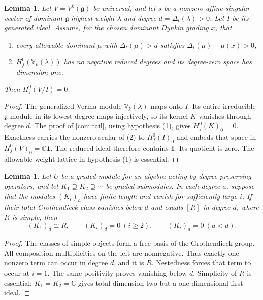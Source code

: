 \documentclass[11pt,a4paper]{amsart}
\numberwithin{equation}{section}
\newtheorem{lemma}[theorem]{Lemma}
\theoremstyle{definition}
\theoremstyle{remark}
\newcommand{\C}{\mathbb C}
\newcommand{\g}{\mathfrak g}
\begin{document}
\begin{lemma}
\label{vtwo:scalar-vacuum}
Let $V=V^k(\g)$ be universal, and let $s$ be a nonzero affine singular
vector of dominant $\g$-highest weight $\lambda$ and degree
$d=\Delta_t(\lambda)>0$. Let $I$ be its generated ideal. Assume, for
the chosen dominant Dynkin grading $x$, that
\begin{enumerate}
\item every allowable dominant $\mu$ with $\Delta_t(\mu)>d$ satisfies
$\Delta_t(\mu)-\mu(x)>0$,
\item $H_f^0(\mathbb V_k(\lambda))$ has no negative reduced degrees
and its degree-zero space has dimension one.
\end{enumerate}
Then $H_f^0(V/I)=0$.
\end{lemma}
\begin{proof}
The generalized Verma module $\mathbb V_k(\lambda)$ maps onto $I$. Its entire
irreducible $\g$-module in its lowest degree maps injectively, so its kernel $K$ vanishes
through degree $d$. The proof of \cref{com:tail}, using hypothesis (1),
gives $H_f^0(K)_0=0$. Exactness carries the nonzero scalar of (2) to
$H_f^0(I)_0$ and embeds that space in $H_f^0(V)_0=\C\mathbf1$.
The reduced ideal therefore contains $\mathbf1$. Its quotient
is zero. The allowable weight lattice in hypothesis (1) is essential.
\end{proof}


\begin{lemma}
\label{vtwo:first-top}
Let $U$ be a graded module for an algebra acting by
degree-preserving operators, and let $K_1\supseteq K_2\supseteq\cdots$
be graded submodules. In each degree $a$, suppose that the modules
$(K_i)_a$ have finite length and vanish for sufficiently large $i$. If their total Grothendieck class vanishes below $d$ and
equals $[R]$ in degree $d$, where $R$ is simple, then
$$
 (K_1)_d\cong R,\qquad (K_i)_d=0\ (i\ge2),
 \qquad (K_i)_a=0\ (a<d).
$$
\end{lemma}
\begin{proof}
The classes of simple objects form a free basis of the Grothendieck group. All
composition multiplicities on the left are nonnegative. Thus exactly
one nonzero term can occur in degree $d$, and it is $R$. Nestedness
forces that term to occur at $i=1$. The same positivity proves vanishing below
$d$. Simplicity of $R$ is essential: $K_1=K_2=\C$ gives total
dimension two but a one-dimensional first ideal.
\end{proof}
\end{document}
